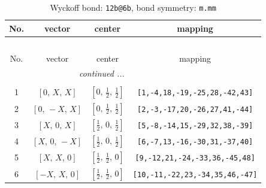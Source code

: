 \documentclass[fleqn,8pt]{jsarticle}
\begin{document}
\renewcommand{\arraystretch}{1.2}
\begin{longtable}{cccc}
\caption{Wyckoff bond: {\tt 12b@6b}, bond symmetry: {\tt m.mm}}
 \\
 \hline \hline
No. & vector & center & mapping \\ \hline \endfirsthead

\multicolumn{3}{l}{\tablename\ \thetable{}} \\
 \hline \hline
No. & vector & center & mapping \\ \hline \endhead

 \hline \hline
\multicolumn{3}{r}{\footnotesize\it continued ...} \\ \endfoot

 \hline \hline
\multicolumn{3}{r}{} \\ \endlastfoot

1 & $\left[ 0,\, X,\, X \right]$ & $\left[ 0,\, \frac{1}{2},\, \frac{1}{2} \right]$ & {\tt [1,-4,18,-19,-25,28,-42,43]} \\ \hline
2 & $\left[ 0,\, - X,\, X \right]$ & $\left[ 0,\, \frac{1}{2},\, \frac{1}{2} \right]$ & {\tt [2,-3,-17,20,-26,27,41,-44]} \\ \hline
3 & $\left[ X,\, 0,\, X \right]$ & $\left[ \frac{1}{2},\, 0,\, \frac{1}{2} \right]$ & {\tt [5,-8,-14,15,-29,32,38,-39]} \\ \hline
4 & $\left[ X,\, 0,\, - X \right]$ & $\left[ \frac{1}{2},\, 0,\, \frac{1}{2} \right]$ & {\tt [6,-7,13,-16,-30,31,-37,40]} \\ \hline
5 & $\left[ X,\, X,\, 0 \right]$ & $\left[ \frac{1}{2},\, \frac{1}{2},\, 0 \right]$ & {\tt [9,-12,21,-24,-33,36,-45,48]} \\ \hline
6 & $\left[ - X,\, X,\, 0 \right]$ & $\left[ \frac{1}{2},\, \frac{1}{2},\, 0 \right]$ & {\tt [10,-11,-22,23,-34,35,46,-47]} \\
\end{longtable}
\renewcommand{\arraystretch}{1.2}
\end{document}
